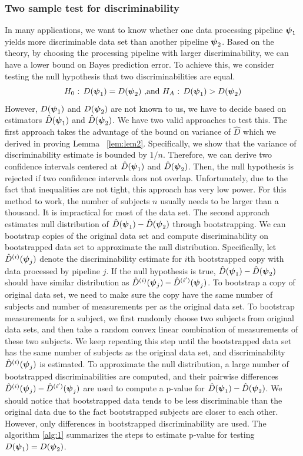 \documentclass{article}
\begin{document}
\subsubsection{Two sample test for discriminability}
In many applications, we want to know whether one data processing pipeline $\boldsymbol{\psi}_1$ yields more discriminable data set than another pipeline $\boldsymbol{\psi}_2$. Based on the theory, by choosing the processing pipeline with larger discriminability, we can have a lower bound on Bayes prediction error. To achieve this, we consider testing the null hypothesis that two discriminabilities are equal.
\[H_0 \text{ : } D(\boldsymbol{\psi}_1) = D(\boldsymbol{\psi}_2) \text{ ,and }  H_A \text{ : } D(\boldsymbol{\psi}_1) > D(\boldsymbol{\psi}_2)\] 
However, $D(\boldsymbol{\psi}_1)$ and $D(\boldsymbol{\psi}_2)$ are not known to us, we have to decide based on estimators $\hat{D}(\boldsymbol{\psi}_1)$ and $\hat{D}(\boldsymbol{\psi}_2)$. We have two valid approaches to test this. The first approach takes the advantage of the bound on variance of $\hat{D}$ which we derived in proving Lemma ~\ref{lem:lem2}. Specifically, we show that the variance of discriminability estimate is bounded by $1/n$. Therefore, we can derive two confidence intervals centered at $\hat{D}(\boldsymbol{\psi}_1)$ and $\hat{D}(\boldsymbol{\psi}_2)$. Then, the null hypothesis is rejected if two confidence intervals does not overlap. Unfortunately, due to the fact that inequalities are not tight, this approach has very low power. For this method to work, the number of subjects $n$ usually needs to be larger than a thousand. It is impractical for most of the data set. The second approach estimates null distribution of $\hat{D}(\boldsymbol{\psi}_1) - \hat{D}(\boldsymbol{\psi}_2)$ through bootstrapping. We can bootstrap copies of the original data set and compute discriminability on bootstrapped data set to approximate the null distribution. Specifically, let $\hat{D}^{(i)}(\boldsymbol{\psi}_j)$ denote the discriminability estimate for $i$th bootstrapped copy with data processed by pipeline $j$. If the null hypothesis is true, $\hat{D}(\boldsymbol{\psi}_1) - \hat{D}(\boldsymbol{\psi}_2)$ should have similar distribution as $\hat{D}^{(i)}(\boldsymbol{\psi}_j)-\hat{D}^{(i')}(\boldsymbol{\psi}_j)$. To bootstrap a copy of original data set, we need to make sure the copy have the same number of subjects and number of measurements per as the original data set. To bootstrap measurements for a subject, we first randomly choose two subjects from original data sets, and then take a random convex linear combination of measurements of these two subjects. We keep repeating this step until the bootstrapped data set has the same number of subjects as the original data set, and discriminability $\hat{D}^{(i)}(\boldsymbol{\psi}_j)$ is estimated. To approximate the null distribution, a large number of bootstrapped discriminabilities are computed, and their pairwise differences $\hat{D}^{(i)}(\boldsymbol{\psi}_j)-\hat{D}^{(i')}(\boldsymbol{\psi}_j)$ are used to compute a p-value for $\hat{D}(\boldsymbol{\psi}_1) - \hat{D}(\boldsymbol{\psi}_2)$. We should notice that bootstrapped data tends to be less discriminable than the original data due to the fact bootstrapped subjects are closer to each other. However, only differences in bootstrapped discriminability are used. The algorithm \ref{alg:1} summarizes the steps to estimate p-value for testing $D(\boldsymbol{\psi}_1) = D(\boldsymbol{\psi}_2)$. 
\end{document}

